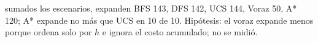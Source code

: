 {sumados los escenarios, expanden BFS 143, DFS 142, UCS 144, Voraz 50, A* 120; A* expande no más que UCS en 10 de 10.}
{Hipótesis: el voraz expande menos porque ordena solo por $h$ e ignora el costo acumulado; no se midió.}
